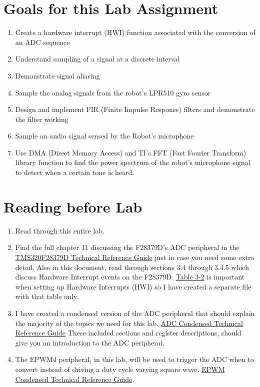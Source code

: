\documentclass[11pt]{article}
\begin{document}
\MakeAssignmentTitle

\section*{Goals for this Lab Assignment}
%
\begin{enumerate}
    \item Create a hardware interrupt (HWI) function associated with the conversion of an ADC sequence
    \item Understand sampling of a signal at a discrete interval
    \item Demonstrate signal aliasing
    \item Sample the analog signals from the robot’s LPR510 gyro sensor
    \item Design and implement FIR (Finite Impulse Response) filters and demonstrate the filter working
    \item Sample an audio signal sensed by the Robot’s microphone
    \item Use DMA (Direct Memory Access) and TI’s FFT (Fast Fourier Transform) library function to find the power spectrum of the robot’s microphone signal to detect when a certain tone is heard.
\end{enumerate}
%
\section*{Reading before Lab}
%
\begin{enumerate}
    \item Read through this entire lab.
    \item Find the full chapter 11 discussing the F28379D’s ADC peripheral in the \href{http://coecsl.ece.illinois.edu/se423/tms320f28379D_TechRefi.pdf}{TMS320F28379D Technical Reference Guide} just in case you need some extra detail. Also in this document, read through sections 3.4 through 3.4.5 which discuss Hardware Interrupt events on the F28379D. \href{http://coecsl.ece.illinois.edu/se423/PeripheralInterruptChannelMapTable.pdf}{Table 3-2} is important when setting up Hardware Interrupts (HWI) so I have created a separate file with that table only.
    \item I have created a condensed version of the ADC peripheral that should explain the majority of the topics we need for this lab. \href{http://coecsl.ece.illinois.edu/se423/ADC_Peripheral.pdf}{ADC Condensed Technical Reference Guide} These included sections and register descriptions, should give you an introduction to the ADC peripheral.
    \item The EPWM4 peripheral, in this lab, will be used to trigger the ADC when to convert instead of driving a duty cycle varying square wave. \href{http://coecsl.ece.illinois.edu/se423/EPWM_Peripheral.pdf}{EPWM Condensed Technical Reference Guide}.
\end{enumerate}
%
\end{document}
